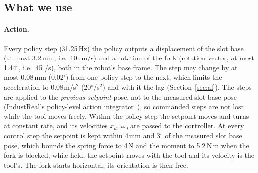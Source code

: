 \subsection{What we use}
\label{sec:controller-what}

\paragraph{Action.} Every policy step (31.25\,Hz) the policy outputs a displacement of the slot base (at most
3.2\,mm, i.e.\ 10\,cm/s) and a rotation of the fork (rotation vector, at most 1.44$^\circ$, i.e.\ 45$^\circ$/s), both in
the robot's base frame. The step may change by at most 0.08\,mm (0.02$^\circ$) from one policy step to the next, which
limits the acceleration to 0.08\,m/s$^2$ (20$^\circ$/s$^2$) and with it the lag (Section~\ref{sec:al}). The steps are
applied to the \emph{previous setpoint} pose, not to the measured slot base pose (IndustReal's policy-level action
integrator~\cite{tang2023industreal}), so commanded steps are not lost while the tool moves freely. Within the policy
step the setpoint moves and turns at constant rate, and its velocities $\dot x_d$, $\omega_d$ are passed to the
controller. At every control step the setpoint is kept within 4\,mm and 3$^\circ$ of the measured slot base pose, which bounds
the spring force to 4\,N and the moment to 5.2\,N\,m when the fork is blocked; while held, the setpoint moves with the
tool and its velocity is the tool's. The fork starts horizontal; its orientation is then free.

